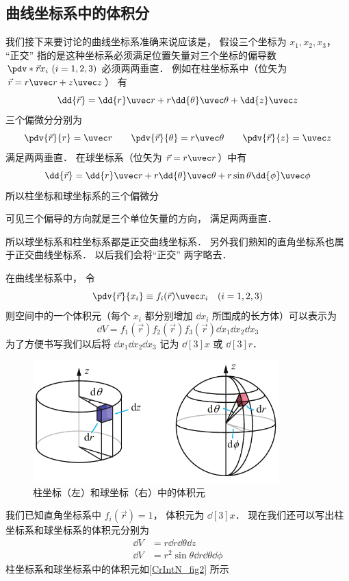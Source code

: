 \subsection{曲线坐标系中的体积分}
我们接下来要讨论的曲线坐标系准确来说应该是， 假设三个坐标为 $x_1, x_2, x_3$， “正交” 指的是这种坐标系必须满足位置矢量对三个坐标的偏导数 $\pdv*{\vec r}{x_i} \,\, (i = 1,2,3)$ 必须两两垂直． 例如在柱坐标系中（位矢为 $\vec r = r\uvec r + z\uvec z$） 有
\begin{equation}
\dd{\vec r} = \dd{r} \uvec r + r\dd{\theta} \uvec\theta + \dd{z}\uvec z
\end{equation}
三个偏微分分别为
\begin{equation}
\pdv{\vec r}{r} = \uvec r \qquad 
\pdv{\vec r}{\theta} = r \uvec \theta \qquad 
\pdv{\vec r}{z} = \uvec z
\end{equation}
满足两两垂直． 在球坐标系（位矢为 $\vec r = r\uvec r$）中有
\begin{equation}
\dd{\vec r} = \dd{r} \uvec r + r\dd{\theta} \uvec\theta + r\sin\theta\dd{\phi}\uvec\phi
\end{equation}
所以柱坐标和球坐标系的三个偏微分

可见三个偏导的方向就是三个单位矢量的方向，%
满足两两垂直．

所以球坐标系和柱坐标系都是正交曲线坐标系． 另外我们熟知的直角坐标系也属于正交曲线坐标系． 以后我们会将“正交” 两字略去．

在曲线坐标系中， 令
\begin{equation}
\pdv{\vec r}{x_i} \equiv f_i(\vec r)\uvec x_i \quad (i = 1,2,3)
\end{equation}
则空间中的一个体积元（每个 $x_i$ 都分别增加 $\dd{x_i}$ 所围成的长方体）可以表示为
\begin{equation}
\dd{V} = f_1(\vec r)f_2(\vec r)f_3(\vec r)\dd{x_1}\dd{x_2}\dd{x_3}
\end{equation}
为了方便书写我们以后将 $\dd{x_1}\dd{x_2}\dd{x_3}$ 记为 $\dd[3]{x}$ 或 $\dd[3]{r}$．

\begin{figure}[ht]
\centering
\includegraphics[width=9.5cm]{./figures/CrIntN2.pdf}
\caption{柱坐标（左）和球坐标（右）中的体积元} \label{CrIntN_fig2}
\end{figure}

我们已知直角坐标系中 $f_i(\vec r) = 1$， 体积元为 $\dd[3]{x}$． 现在我们还可以写出柱坐标系和球坐标系的体积元分别为
\begin{align}
\dd{V} &= r \dd{r}\dd{\theta}\dd{z}\\
\dd{V} &= r^2\sin\theta \dd{r}\dd{\theta}\dd{\phi}
\end{align}
柱坐标系和球坐标系中的体积元如\autoref{CrIntN_fig2} 所示